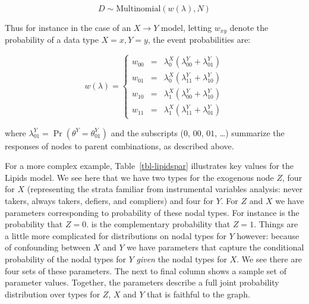 \documentclass[
  11pt,
  article]{jss}
\renewcommand{\texttt}[1]{\code{#1}}
\begin{document}
\[
D \sim \text{Multinomial}(w(\lambda), N)
\]

Thus for instance in the case of an \(X \rightarrow Y\) model, letting
\(w_{xy}\) denote the probability of a data type \(X=x, Y=y\), the event
probabilities are:

\[
w(\lambda) = \left\{\begin{array}{ccc} w_{00} & = & \lambda^X_0(\lambda^Y_{00} + \lambda^Y_{01})\\ 
w_{01} & = & \lambda^X_0(\lambda^Y_{11} + \lambda^Y_{10})\\
w_{10} & = & \lambda^X_1(\lambda^Y_{00} + \lambda^Y_{10})\\
w_{11} & = & \lambda^X_1(\lambda^Y_{11} + \lambda^Y_{01})\end{array} \right.
\]

where \(\lambda^Y_{01}=\Pr(\theta^Y = \theta^Y_{01})\) and the
subscripts (\(0\), \(00\), \(01\), \dots) summarize the responses of
nodes to parent combinations, as described above.

For a more complex example, Table~\ref{tbl-lipidspar} illustrates key
values for the Lipids model. We see here that we have two types for the
exogenous node \(Z\), four for \(X\) (representing the strata familiar
from instrumental variables analysis: never takers, always takers,
defiers, and compliers) and four for \(Y\). For \(Z\) and \(X\) we have
parameters corresponding to probability of these nodal types. For
instance \texttt{Z.0} is the probability that \(Z=0\). \texttt{Z.1} is
the complementary probability that \(Z=1\). Things are a little more
complicated for distributions on nodal types for \(Y\) however: because
of confounding between \(X\) and \(Y\) we have parameters that capture
the conditional probability of the nodal types for \(Y\) \emph{given}
the nodal types for \(X\). We see there are four sets of these
parameters. The next to final column shows a sample set of parameter
values. Together, the parameters describe a full joint probability
distribution over types for \(Z\), \(X\) and \(Y\) that is faithful to
the graph.
\end{document}
